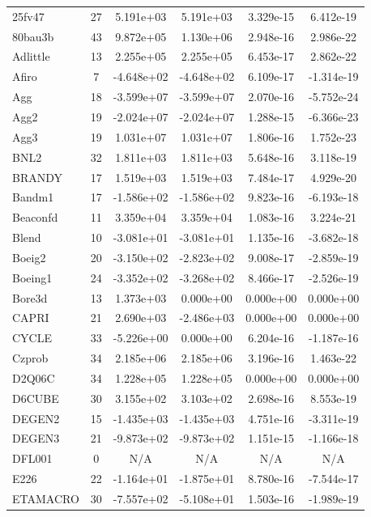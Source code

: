 \documentclass[12pt,a4paper]{article}
\begin{document}
\begin{longtable}{@{}l|ccccc@{}}
\bottomrule
\endlastfoot
25fv47 & 27 & 5.191e+03 & 5.191e+03 & 3.329e-15 & 6.412e-19 \\
80bau3b & 43 & 9.872e+05 & 1.130e+06 & 2.948e-16 & 2.986e-22 \\
Adlittle & 13 & 2.255e+05 & 2.255e+05 & 6.453e-17 & 2.862e-22 \\
Afiro & 7 & -4.648e+02 & -4.648e+02 & 6.109e-17 & -1.314e-19 \\
Agg & 18 & -3.599e+07 & -3.599e+07 & 2.070e-16 & -5.752e-24 \\
Agg2 & 19 & -2.024e+07 & -2.024e+07 & 1.288e-15 & -6.366e-23 \\
Agg3 & 19 & 1.031e+07 & 1.031e+07 & 1.806e-16 & 1.752e-23 \\
BNL2 & 32 & 1.811e+03 & 1.811e+03 & 5.648e-16 & 3.118e-19 \\
BRANDY & 17 & 1.519e+03 & 1.519e+03 & 7.484e-17 & 4.929e-20 \\
Bandm1 & 17 & -1.586e+02 & -1.586e+02 & 9.823e-16 & -6.193e-18 \\
Beaconfd & 11 & 3.359e+04 & 3.359e+04 & 1.083e-16 & 3.224e-21 \\
Blend & 10 & -3.081e+01 & -3.081e+01 & 1.135e-16 & -3.682e-18 \\
Boeig2 & 20 & -3.150e+02 & -2.823e+02 & 9.008e-17 & -2.859e-19 \\
Boeing1 & 24 & -3.352e+02 & -3.268e+02 & 8.466e-17 & -2.526e-19 \\
Bore3d & 13 & 1.373e+03 & 0.000e+00 & 0.000e+00 & 0.000e+00 \\
CAPRI & 21 & 2.690e+03 & -2.486e+03 & 0.000e+00 & 0.000e+00 \\
CYCLE & 33 & -5.226e+00 & 0.000e+00 & 6.204e-16 & -1.187e-16 \\
Czprob & 34 & 2.185e+06 & 2.185e+06 & 3.196e-16 & 1.463e-22 \\
D2Q06C & 34 & 1.228e+05 & 1.228e+05 & 0.000e+00 & 0.000e+00 \\
D6CUBE & 30 & 3.155e+02 & 3.103e+02 & 2.698e-16 & 8.553e-19 \\
DEGEN2 & 15 & -1.435e+03 & -1.435e+03 & 4.751e-16 & -3.311e-19 \\
DEGEN3 & 21 & -9.873e+02 & -9.873e+02 & 1.151e-15 & -1.166e-18 \\
DFL001 & 0 & N/A & N/A & N/A & N/A \\
E226 & 22 & -1.164e+01 & -1.875e+01 & 8.780e-16 & -7.544e-17 \\
ETAMACRO & 30 & -7.557e+02 & -5.108e+01 & 1.503e-16 & -1.989e-19 \\

\end{longtable}
\end{document}
